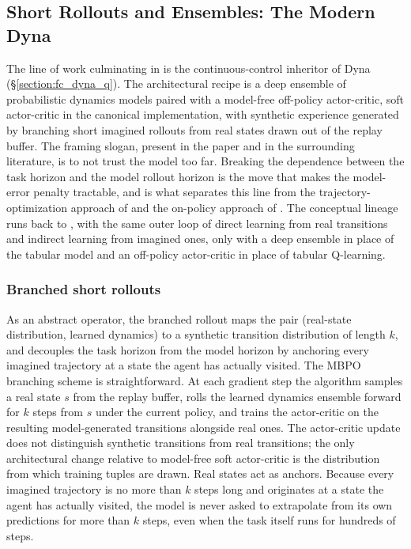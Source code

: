 \subsection{Short Rollouts and Ensembles: The Modern Dyna}
\label{section:fc_mbpo}

The line of work culminating in \citet{janner2019model} is the continuous-control inheritor of Dyna (\S\ref{section:fc_dyna_q}). The architectural recipe is a deep ensemble of probabilistic dynamics models paired with a model-free off-policy actor-critic, soft actor-critic in the canonical implementation, with synthetic experience generated by branching short imagined rollouts from real states drawn out of the replay buffer. The framing slogan, present in the paper and in the surrounding literature, is to not trust the model too far. Breaking the dependence between the task horizon and the model rollout horizon is the move that makes the model-error penalty tractable, and is what separates this line from the trajectory-optimization approach of \citet{Chua2018PETS} and the on-policy approach of \citet{Kurutach2018}. The conceptual lineage runs back to \citet{sutton1990}, with the same outer loop of direct learning from real transitions and indirect learning from imagined ones, only with a deep ensemble in place of the tabular model and an off-policy actor-critic in place of tabular Q-learning.

\subsubsection{Branched short rollouts}
\label{section:fc_mbpo_branching}

As an abstract operator, the branched rollout maps the pair (real-state distribution, learned dynamics) to a synthetic transition distribution of length $k$, and decouples the task horizon from the model horizon by anchoring every imagined trajectory at a state the agent has actually visited. The MBPO branching scheme is straightforward. At each gradient step the algorithm samples a real state $s$ from the replay buffer, rolls the learned dynamics ensemble forward for $k$ steps from $s$ under the current policy, and trains the actor-critic on the resulting model-generated transitions alongside real ones. The actor-critic update does not distinguish synthetic transitions from real transitions; the only architectural change relative to model-free soft actor-critic is the distribution from which training tuples are drawn. Real states act as anchors. Because every imagined trajectory is no more than $k$ steps long and originates at a state the agent has actually visited, the model is never asked to extrapolate from its own predictions for more than $k$ steps, even when the task itself runs for hundreds of steps.

